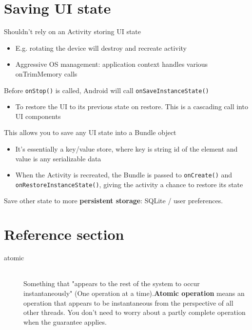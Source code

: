 \documentclass{article}
\begin{document}
\section{Saving UI state}
Shouldn't rely on an Activity storing UI state
\begin{itemize}
  \item E.g. rotating the device will destroy and recreate activity
  \item Aggressive OS management: application context handles various onTrimMemory calls
\end{itemize}
Before \texttt{onStop()} is called, Android will call \texttt{onSaveInstanceState()}
\begin{itemize}
  \item To restore the UI to its previous state on restore. This is a cascading	call into UI components
\end{itemize}
This allows you to save any UI state into a Bundle object
\begin{itemize}
  \item It's essentially a key/value store, where key is string id of the element and value is any serializable data
  \item When the Activity is recreated, the Bundle is passed to \texttt{onCreate()} and \texttt{onRestoreInstanceState()}, giving the activity a chance to restore its state
\end{itemize}
Save other state to more \textbf{persistent storage}: SQLite / user preferences.


\newpage

\section*{Reference section} \label{sec:reference}
\begin{description}
	\item[atomic] \hfill \\ Something that "appears to the rest of the system to occur instantaneously" (One operation at a time).\textbf{Atomic operation} means an operation that appears to be instantaneous from the perspective of all other threads. You don't need to worry about a partly complete operation when the guarantee applies.
\end{description}
\end{document}
